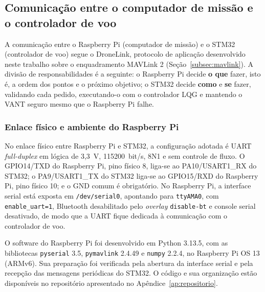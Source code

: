
\subsection{Comunicação entre o computador de missão e o controlador de voo}\label{subsec:metodo_comunicacao}

A comunicação entre o Raspberry Pi (computador de missão) e o STM32 (controlador de voo) segue o DroneLink, protocolo de aplicação desenvolvido neste trabalho sobre o enquadramento MAVLink 2 (Seção~\ref{subsec:mavlink}). A divisão de responsabilidades é a seguinte: o Raspberry Pi decide \textbf{o que} fazer, isto é, a ordem dos pontos e o próximo objetivo; o STM32 decide \textbf{como} e \textbf{se} fazer, validando cada pedido, executando-o com o controlador LQG e mantendo o VANT seguro mesmo que o Raspberry Pi falhe.

\subsubsection{Enlace físico e ambiente do Raspberry Pi}\label{subsubsec:com_enlace}

No enlace físico entre Raspberry Pi e STM32, a configuração adotada é UART \textit{full-duplex} em lógica de 3,3~V, 115200~bit/s, 8N1 e sem controle de fluxo. O GPIO14/TXD do Raspberry Pi, pino físico 8, liga-se ao PA10/USART1\_RX do STM32; o PA9/USART1\_TX do STM32 liga-se ao GPIO15/RXD do Raspberry Pi, pino físico 10; e o GND comum é obrigatório. No Raspberry Pi, a interface serial está exposta em \texttt{/dev/serial0}, apontando para \texttt{ttyAMA0}, com \texttt{enable\_uart=1}, Bluetooth desabilitado pelo \textit{overlay} \texttt{disable-bt} e console serial desativado, de modo que a UART fique dedicada à comunicação com o controlador de voo.

O software do Raspberry Pi foi desenvolvido em Python 3.13.5, com as bibliotecas \texttt{pyserial} 3.5, \texttt{pymavlink} 2.4.49 e \texttt{numpy} 2.2.4, no Raspberry Pi OS 13 (ARMv6). Sua preparação foi verificada pela abertura da interface serial e pela recepção das mensagens periódicas do STM32. O código e sua organização estão disponíveis no repositório apresentado no Apêndice~\ref{ap:repositorio}.

